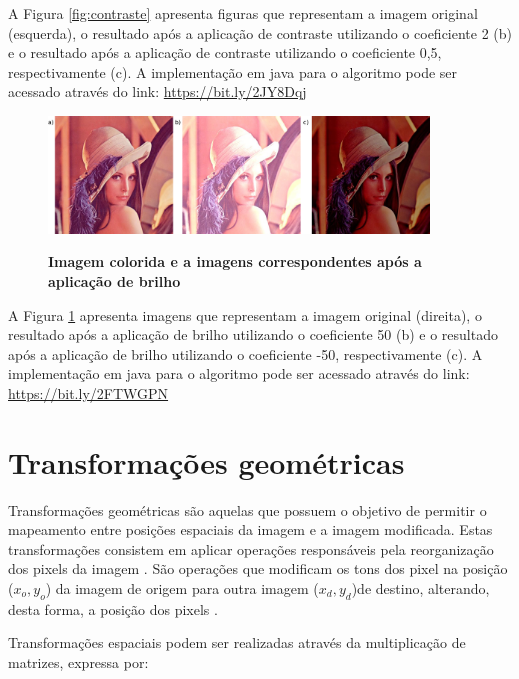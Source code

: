\documentclass[
	12pt,				%
	oneside,			%
	a4paper,			%
	english,			%
	french,				%
	spanish,			%
	brazil,				%
	]{abntex2}
\begin{document}
A Figura \ref{fig:contraste} apresenta figuras que representam a imagem original (esquerda), o resultado após a aplicação de contraste utilizando o coeficiente 2 (b) e o resultado após a aplicação de contraste utilizando o coeficiente 0,5, respectivamente (c). A implementação em java para o algoritmo pode ser acessado através do link: \url{https://bit.ly/2JY8Dqj}

\begin{figure}[ht]
\centering
\caption{\textbf{Imagem colorida e a imagens correspondentes após a aplicação de brilho}}
\includegraphics[width=0.9\textwidth]{imagens/brilho.png}
\sourceAuthor
\label{fig:brilho}
\end{figure}

A Figura \ref{fig:brilho} apresenta imagens que representam a imagem original (direita), o resultado após a aplicação de brilho utilizando o coeficiente 50 (b) e o resultado após a aplicação de brilho utilizando o coeficiente -50, respectivamente (c). A implementação em java para o algoritmo pode ser acessado através do link: \url{https://bit.ly/2FTWGPN}

\section{Transformações geométricas}

Transformações geométricas são aquelas que possuem o objetivo de permitir o mapeamento entre posições espaciais da imagem e a imagem modificada. Estas transformações consistem em aplicar operações responsáveis pela reorganização dos pixels da imagem \cite{pedriniSchwartz:2008}. São operações que modificam os tons dos pixel na posição (\(x_o, y_o\)) da imagem de origem para outra imagem (\(x_d, y_d\))de destino, alterando, desta forma, a posição dos pixels \cite{conciAzevedoLeta:2008}.

Transformações espaciais podem ser realizadas através da multiplicação de matrizes, expressa por:
\end{document}
